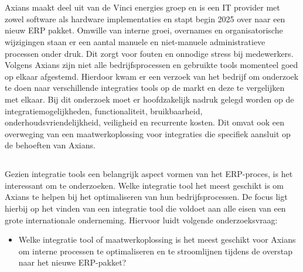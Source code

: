 
\chapter{}%
\label{ch:inleiding}

\section{}%
\label{sec:probleemstelling}

Axians maakt deel uit van de Vinci energies groep en is een IT provider met zowel software als hardware implementaties en stapt begin 2025 over naar een nieuw ERP pakket. Omwille van interne groei, overnames en organisatorische wijzigingen staan er een aantal manuele en niet-manuele administratieve processen onder druk. Dit zorgt voor fouten en onnodige stress bij medewerkers. Volgens Axians zijn niet alle bedrijfsprocessen en gebruikte tools momenteel goed op elkaar afgestemd. Hierdoor kwam er een verzoek van het bedrijf om onderzoek te doen naar verschillende integraties tools op de markt en deze te vergelijken met elkaar. Bij dit onderzoek moet er hoofdzakelijk nadruk gelegd worden op de integratiemogelijkheden, functionaliteit, bruikbaarheid, onderhoudsvriendelijkheid, veiligheid en recurrente kosten. Dit omvat ook een overweging van een maatwerkoplossing voor integraties die specifiek aansluit op de behoeften van Axians.

\section{}%
\label{sec:onderzoeksvraag}

Gezien integratie tools een belangrijk aspect vormen van het ERP-proces, is het interessant om te onderzoeken. Welke integratie tool het meest geschikt is om Axians te helpen bij het optimaliseren van hun bedrijfsprocessen. De focus ligt hierbij op het vinden van een integratie tool die voldoet aan alle eisen van een grote internationale onderneming. Hiervoor luidt volgende onderzoeksvraag:

\begin{itemize}
  \item Welke integratie tool of maatwerkoplossing is het meest geschikt voor Axians om interne processen te optimaliseren en te stroomlijnen tijdens de overstap naar het nieuwe ERP-pakket?
\end{itemize}

